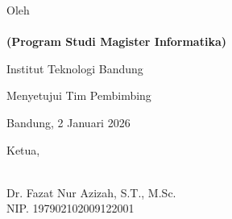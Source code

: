 \clearpage
\pagestyle{empty}


\begin{center}
    \smallskip

    \singlespacing
    \fontsize{14pt}{17pt}\selectfont \bfseries \MakeUppercase{\thetitle}
    
    \vspace{6\baselineskip}
    
   \normalsize \normalfont
    Oleh\\[0ex]
    \textbf{\fontsize{14pt}{17pt}\selectfont \theauthor} \\[0ex]
    \textbf{(Program Studi Magister Informatika)}
    
    Institut Teknologi Bandung \\

    \vspace{5\baselineskip}
    
    Menyetujui Tim Pembimbing

    \vspace{\baselineskip}

    Bandung, 2 Januari 2026

    \vspace{2\baselineskip}

    Ketua,

    \vspace{3\baselineskip}

    \underline{\hspace{5cm}} \\
    \vspace{5mm}
    Dr. Fazat Nur Azizah, S.T., M.Sc. \\
    NIP. 197902102009122001
    
\end{center}
\clearpage
